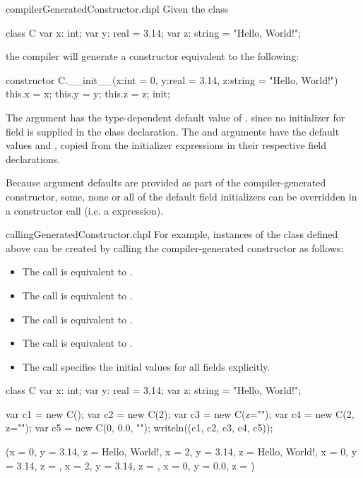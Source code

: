 \begin{chapelexample}{compilerGeneratedConstructor.chpl}
Given the class
\begin{chapel}
class C {
  var x: int;
  var y: real = 3.14;
  var z: string = "Hello, World!";
}
\end{chapel}
the compiler will generate a constructor equivalent to the following:
\begin{chapel}
constructor C.__init__(x:int = 0, y:real = 3.14, z:string = "Hello, World!")
{ this.x = x; this.y = y; this.z = z; init; }
\end{chapel}
The  argument has the type-dependent default value of , since no initializer for
field  is supplied in the class declaration. The  and 
arguments have the default values  and ,
copied from the initializer expressions in their respective field declarations.
\end{chapelexample}

Because argument defaults are provided as part of the compiler-generated
constructor, some, none or all of the default field initializers can be
overridden in a constructor call (i.e. a  expression).

\begin{chapelexample}{callingGeneratedConstructor.chpl}
For example, instances of the class  defined above can be created by calling the compiler-generated constructor as follows:
\begin{itemize}
\item The call  is equivalent to .
\item The call  is equivalent to .
\item The call  is equivalent to .
\item The call  is equivalent to .
\item The call  specifies the initial values for all fields explicitly.
\end{itemize}
\begin{chapelpre}
class C {
  var x: int;
  var y: real = 3.14;
  var z: string = "Hello, World!";
}
\end{chapelpre}
\begin{chapelpost}
var c1 = new C();
var c2 = new C(2);
var c3 = new C(z="");
var c4 = new C(2, z="");
var c5 = new C(0, 0.0, "");
writeln((c1, c2, c3, c4, c5));
\end{chapelpost}
\begin{chapeloutput}
({x = 0, y = 3.14, z = Hello, World!}, {x = 2, y = 3.14, z = Hello, World!}, {x = 0, y = 3.14, z = }, {x = 2, y = 3.14, z = }, {x = 0, y = 0.0, z = })
\end{chapeloutput}
\end{chapelexample}

